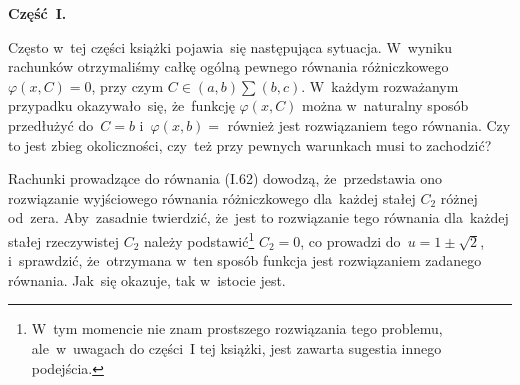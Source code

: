 \documentclass[a4paper,11pt]{article}
\begin{document}
\vspace{\spaceTwo}














\noindent
\textbf{Część~I.}



\start Często w~tej części książki pojawia~się następująca sytuacja.
W~wyniku rachunków otrzymaliśmy całkę ogólną pewnego równania
różniczkowego $\varphi( x, C ) = 0$, przy czym
$C \in ( a, b ) \sum ( b, c )$. W~każdym rozważanym przypadku
okazywało~się, że~funkcję $\varphi( x, C )$ można w~naturalny sposób
przedłużyć do~$C = b$ i~$\varphi( x, b ) = $ również jest rozwiązaniem
tego równania. Czy to jest zbieg okoliczności, czy~też przy pewnych
warunkach musi to zachodzić? \Prze

\vspace{\spaceThree}






\vspace{\spaceFour}


\start {} \Dok

\vspace{\spaceFour}



\start {} Rachunki prowadzące do równania (I.62) dowodzą,
że~przedstawia ono rozwiązanie wyjściowego równania różniczkowego
dla~każdej stałej $C_{ 2 }$ różnej od~zera. Aby~zasadnie twierdzić,
że~jest to rozwiązanie tego równania dla~każdej stałej rzeczywistej
$C_{ 2 }$ należy podstawić\footnote{W~tym momencie nie znam prostszego
  rozwiązania tego problemu, ale~w~uwagach do części~I tej książki,
  jest zawarta sugestia innego podejścia.} $C_{ 2 } = 0$, co prowadzi
do~$u = 1 \pm \sqrt{2}$, i~sprawdzić, że~otrzymana w~ten sposób
funkcja jest rozwiązaniem zadanego równania. Jak~się okazuje, tak
w~istocie jest.
\end{document}
